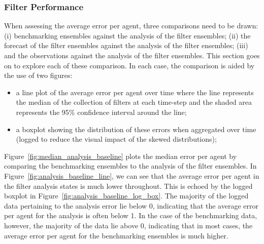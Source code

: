 \documentclass{article}
\begin{document}
\subsubsection*{Filter Performance}

When assessing the average error per agent, three comparisons need to be drawn: (i) benchmarking ensembles against the analysis of the filter ensembles; (ii) the forecast of
the filter ensembles against the analysis of the filter ensembles; (iii) and the observations against the analysis of the filter ensembles.  This section goes on to explore each of these comparison. In each case, the comparison is aided by the use of two figures: 
\begin{itemize}
	\item  a line plot of the average error per agent over time where the line represents the median of the collection of filters at each time-step and the shaded area represents the 95\% confidence interval around the line; 
	\item a boxplot showing the distribution of these errors when aggregated over time (logged to reduce the visual impact of the skewed distributions);
\end{itemize}

Figure~\ref{fig:median_analysis_baseline} plots the median error per agent by comparing the benchmarking ensembles to the analysis of the filter ensembles. In Figure~\ref{fig:analysis_baseline_line}, we can see that the average error per agent in the filter analysis states is much lower throughout. This is echoed by the logged boxplot in Figure~\ref{fig:analysis_baseline_log_box}. The majority of the logged data pertaining to the analysis error lie below 0, indicating that the average error per agent for the analysis is often below 1. In the case of the benchmarking data, however, the majority of the data lie above 0, indicating that in most cases, the average error per agent for the benchmarking ensembles is much higher.
\end{document}
